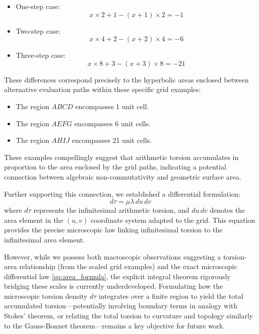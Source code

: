 \begin{itemize}
    \item One-step case:
    \begin{equation}
        x \times 2 + 1 - (x + 1) \times 2 = -1
    \end{equation}

    \item Two-step case:
    \begin{equation}
        x \times 4 + 2 - (x + 2) \times 4 = -6
    \end{equation}

    \item Three-step case:
    \begin{equation}
        x \times 8 + 3 - (x + 3) \times 8 = -21
    \end{equation}
\end{itemize}

These differences correspond precisely to the hyperbolic areas enclosed between alternative evaluation paths within these specific grid examples:

\begin{itemize}
    \item The region $ABCD$ encompasses 1 unit cell.
    \item The region $AEFG$ encompasses 6 unit cells.
    \item The region $AHIJ$ encompasses 21 unit cells.
\end{itemize}
These examples compellingly suggest that arithmetic torsion accumulates in proportion to the area enclosed by the grid paths, indicating a potential connection between algebraic non-commutativity and geometric surface area.

Further supporting this connection, we established a differential formulation:
\begin{equation}
    d\tau = \mu \lambda\, du\, dv \label{eq:area_formula}
\end{equation}
where $d\tau$ represents the infinitesimal arithmetic torsion, and $du\, dv$ denotes the area element in the $(u, v)$ coordinate system adapted to the grid. This equation provides the precise microscopic law linking infinitesimal torsion to the infinitesimal area element.

However, while we possess both macroscopic observations suggesting a torsion-area relationship (from the scaled grid examples) and the exact microscopic differential law \eqref{eq:area_formula}, the explicit integral theorem rigorously bridging these scales is currently underdeveloped. Formulating how the microscopic torsion density $d\tau$ integrates over a finite region to yield the total accumulated torsion—potentially involving boundary terms in analogy with Stokes' theorem, or relating the total torsion to curvature and topology similarly to the Gauss-Bonnet theorem—remains a key objective for future work.

